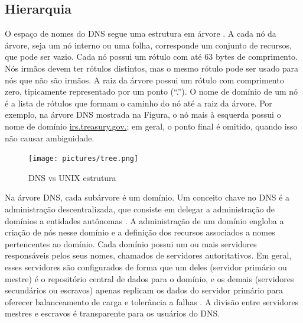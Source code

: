 

\subsection{Hierarquia}

O espaço de nomes do DNS segue uma estrutura em árvore
\cite{rfc1034}. A cada nó da árvore, seja um nó interno ou uma folha,
corresponde um conjunto de recursos, que pode ser vazio. Cada nó possui
um rótulo com até 63 bytes de comprimento. Nós irmãos devem ter
rótulos distintos, mas o mesmo rótulo pode ser usado para nós que não
são irmãos. A raiz da árvore possui um rótulo com comprimento zero,
tipicamente representado por um ponto (``.''). O nome de domínio de um
nó é a lista de rótulos que formam o caminho do nó até a raiz da
árvore. Por exemplo, na árvore DNS mostrada na Figura, o nó mais à
esquerda possui o nome de domínio \url{irs.treasury.gov.}; em geral, o
ponto final é omitido, quando isso não causar ambiguidade.


    \begin{figure}[ht]
        \centering
        \texttt{[image: pictures/tree.png]}
        \caption{DNS vs UNIX estrutura}
        \label{fig:tree}
    \end{figure}

Na árvore DNS, cada subárvore é um domínio. Um conceito chave no DNS é a administração descentralizada, que consiste em delegar a administração de domínios a entidades autônomas \cite{Mockapetris:1988}. A administração de um domínio engloba a criação de nós nesse domínio e a definição dos recursos associados a nomes pertencentes ao domínio. Cada domínio possui um ou mais servidores responsáveis pelos seus nomes,  chamados de servidores autoritativos. Em geral, esses servidores são configurados de forma que um deles (servidor primário ou mestre) é o repositório central de dados para o domínio, e os demais (servidores secundários ou escravos) apenas replicam  os dados do servidor primário para oferecer balanceamento de carga e tolerância a falhas \cite{Liu:2006}. A divisão entre servidores mestres e escravos é transparente para os usuários do DNS\@.

